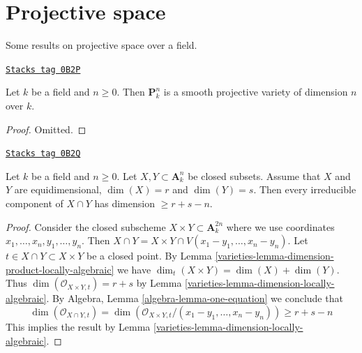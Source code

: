 \section{Projective space}
\label{varieties-section-projective-space}
Some results on projective space over a field.

\begin{lemma}
\label{varieties-lemma-projective-space-smooth}
\href{https://stacks.math.columbia.edu/tag/0B2P}{\texttt{Stacks tag 0B2P}}


Let $k$ be a field and $n \geq 0$. Then $\mathbf{P}^n_k$ is a
smooth projective variety of dimension $n$ over $k$.
\end{lemma}

\begin{proof}
Omitted.
\end{proof}

\begin{lemma}
\label{varieties-lemma-intersection-in-affine-space}
\href{https://stacks.math.columbia.edu/tag/0B2Q}{\texttt{Stacks tag 0B2Q}}

Let $k$ be a field and $n \geq 0$. Let $X, Y \subset \mathbf{A}^n_k$
be closed subsets. Assume that $X$ and $Y$ are equidimensional,
$\dim(X) = r$ and $\dim(Y) = s$.
Then every irreducible component of $X \cap Y$ has dimension $\geq r + s - n$.
\end{lemma}

\begin{proof}

Consider the closed subscheme $X \times Y \subset \mathbf{A}^{2n}_k$
where we use coordinates $x_1, \ldots, x_n, y_1, \ldots, y_n$. Then
$X \cap Y = X \times Y \cap V(x_1 - y_1, \ldots, x_n - y_n)$.
Let $t \in X \cap Y \subset X \times Y$ be a closed point.
By Lemma \ref{varieties-lemma-dimension-product-locally-algebraic}
we have $\dim_t(X \times Y) = \dim(X) + \dim(Y)$.
Thus $\dim(\mathcal{O}_{X \times Y, t}) = r + s$ by
Lemma \ref{varieties-lemma-dimension-locally-algebraic}.
By Algebra, Lemma \ref{algebra-lemma-one-equation}
we conclude that
$$
\dim(\mathcal{O}_{X \cap Y, t}) =
\dim(\mathcal{O}_{X \times Y, t}/(x_1 - y_1, \ldots, x_n - y_n)) \geq
r + s - n
$$
This implies the result by Lemma \ref{varieties-lemma-dimension-locally-algebraic}.
\end{proof}

